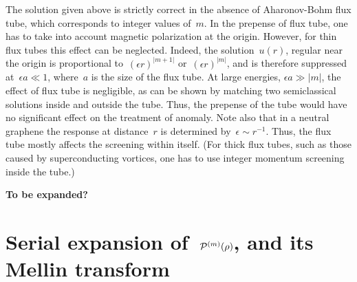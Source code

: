 \documentclass[preprint,aps,prb]{revtex4}
\begin{document}
The solution given above is strictly correct in the absence of 
Aharonov-Bohm flux tube, which corresponds to integer values of~$m$. 
In the prepense of flux tube, one has to take into account 
magnetic polarization at the origin. However, for thin flux tubes
this effect can be neglected. Indeed, the solution~$u(r)$, regular near the origin
is proportional to~$(\epsilon r)^|m + 1|$ or~$(\epsilon r)^{|m|}$, and 
is therefore suppressed at~$\epsilon a \ll 1$, where~$a$ is the size
of the flux tube. At large energies, $\epsilon a \gg |m|$, the effect of
flux tube is negligible, as can be shown by matching two semiclassical
solutions inside and outside the tube. Thus, the prepense of the tube
would have no significant effect on the treatment of anomaly. 
Note also  that in a neutral graphene the response at distance~$r$ 
is determined by~$\epsilon \sim r^{-1}$. Thus, the flux tube 
mostly affects the screening within itself. (For thick flux tubes,
such as those caused by superconducting vortices, 
one has to use integer momentum screening inside the tube.)

{\bf To be expanded?}

\section{Serial expansion of~${\cal P}^{(m)}(\rho)$, and its Mellin
transform}
\end{document}

